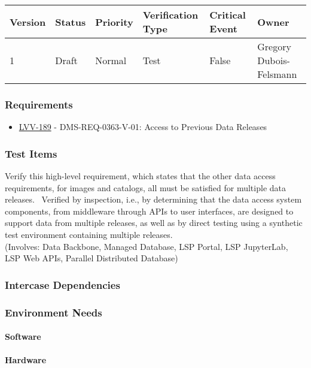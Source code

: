 \begin{longtable}[]{llllll}
\toprule
Version & Status & Priority & Verification Type & Critical Event & Owner
\\\midrule
1 & Draft & Normal &
Test & False & Gregory Dubois-Felsmann
\\\bottomrule
\end{longtable}

\subsubsection{Requirements}
\begin{itemize}
\item \href{https://jira.lsstcorp.org/browse/LVV-189}{LVV-189} - DMS-REQ-0363-V-01: Access to Previous Data Releases
\end{itemize}

\subsubsection{Test Items}
Verify this high-level requirement, which states that the other data
access requirements, for images and catalogs, all must be satisfied for
multiple data releases. ~Verified by inspection, i.e., by determining
that the data access system components, from middleware through APIs to
user interfaces, are designed to support data from multiple releases, as
well as by direct testing using a synthetic test environment containing
multiple releases.\\
(Involves: Data Backbone, Managed Database, LSP Portal, LSP JupyterLab,
LSP Web APIs, Parallel Distributed Database)



\subsubsection{Intercase Dependencies}

\subsubsection{Environment Needs}

\paragraph{Software}

\paragraph{Hardware}

